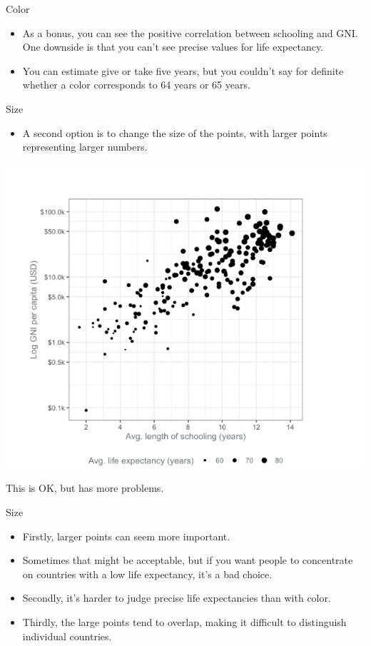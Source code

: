 \documentclass[
  ignorenonframetext,
]{beamer}
\providecommand{\tightlist}{%
  \setlength{\itemsep}{0pt}\setlength{\parskip}{0pt}}
\begin{document}
\begin{frame}{Color}
\label{color-2}
\begin{itemize}
\item
  As a bonus, you can see the positive correlation between schooling and
  GNI. One downside is that you can't see precise values for life
  expectancy.
\item
  You can estimate give or take five years, but you couldn't say for
  definite whether a color corresponds to 64 years or 65 years.
\end{itemize}
\end{frame}

\begin{frame}{Size}
\label{size}
\begin{itemize}
\tightlist
\item
  A second option is to change the size of the points, with larger
  points representing larger numbers.
\end{itemize}

\includegraphics{../images/im67.png}

This is OK, but has more problems.
\end{frame}

\begin{frame}{Size}
\label{size-1}
\begin{itemize}
\item
  Firstly, larger points can seem more important.
\item
  Sometimes that might be acceptable, but if you want people to
  concentrate on countries with a low life expectancy, it's a bad
  choice.
\item
  Secondly, it's harder to judge precise life expectancies than with
  color.
\item
  Thirdly, the large points tend to overlap, making it difficult to
  distinguish individual countries.
\end{itemize}
\end{frame}
\end{document}
